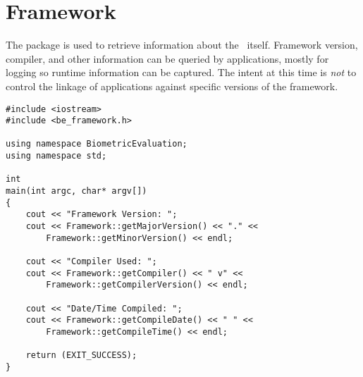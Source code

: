 %
%
\chapter{Framework}
The  package is used to retrieve information about the \lname\ itself.
Framework version, compiler, and other information can be queried by
applications, mostly
for logging so runtime information can be captured. The intent at this time
is {\em not} to control the linkage of applications against specific
versions of the framework.
\label{chp-framework}

\begin{lstlisting}[caption={Using the \namespace{Framework} API}, label=frameworkuse]
#include <iostream>
#include <be_framework.h>

using namespace BiometricEvaluation;
using namespace std;

int
main(int argc, char* argv[])
{
    cout << "Framework Version: ";
    cout << Framework::getMajorVersion() << "." <<
        Framework::getMinorVersion() << endl;

    cout << "Compiler Used: ";
    cout << Framework::getCompiler() << " v" <<
        Framework::getCompilerVersion() << endl;

    cout << "Date/Time Compiled: ";
    cout << Framework::getCompileDate() << " " <<
        Framework::getCompileTime() << endl;

    return (EXIT_SUCCESS);
}
\end{lstlisting}
